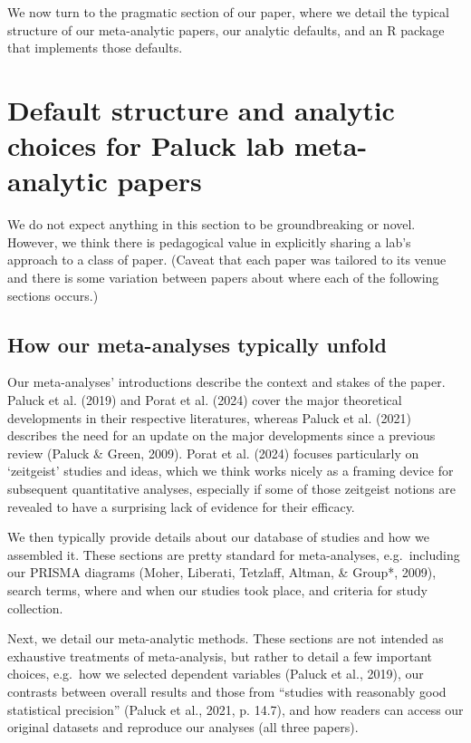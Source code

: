 \documentclass[
  ,jou]{apa6}
\begin{document}
We now turn to the pragmatic section of our paper, where we detail the typical structure of our meta-analytic papers, our analytic defaults, and an R package that implements those defaults.

\section{Default structure and analytic choices for Paluck lab meta-analytic papers}\label{default-structure-and-analytic-choices-for-paluck-lab-meta-analytic-papers}

We do not expect anything in this section to be groundbreaking or novel. However, we think there is pedagogical value in explicitly sharing a lab's approach to a class of paper. (Caveat that each paper was tailored to its venue and there is some variation between papers about where each of the following sections occurs.)

\subsection{How our meta-analyses typically unfold}\label{how-our-meta-analyses-typically-unfold}

Our meta-analyses' introductions describe the context and stakes of the paper. Paluck et al. (2019) and Porat et al. (2024) cover the major theoretical developments in their respective literatures, whereas Paluck et al. (2021) describes the need for an update on the major developments since a previous review (Paluck \& Green, 2009). Porat et al. (2024) focuses particularly on `zeitgeist' studies and ideas, which we think works nicely as a framing device for subsequent quantitative analyses, especially if some of those zeitgeist notions are revealed to have a surprising lack of evidence for their efficacy.

We then typically provide details about our database of studies and how we assembled it. These sections are pretty standard for meta-analyses, e.g.~including our PRISMA diagrams (Moher, Liberati, Tetzlaff, Altman, \& Group*, 2009), search terms, where and when our studies took place, and criteria for study collection.

Next, we detail our meta-analytic methods. These sections are not intended as exhaustive treatments of meta-analysis, but rather to detail a few important choices, e.g.~how we selected dependent variables (Paluck et al., 2019), our contrasts between overall results and those from ``studies with reasonably good statistical precision'' (Paluck et al., 2021, p. 14.7), and how readers can access our original datasets and reproduce our analyses (all three papers).
\end{document}
